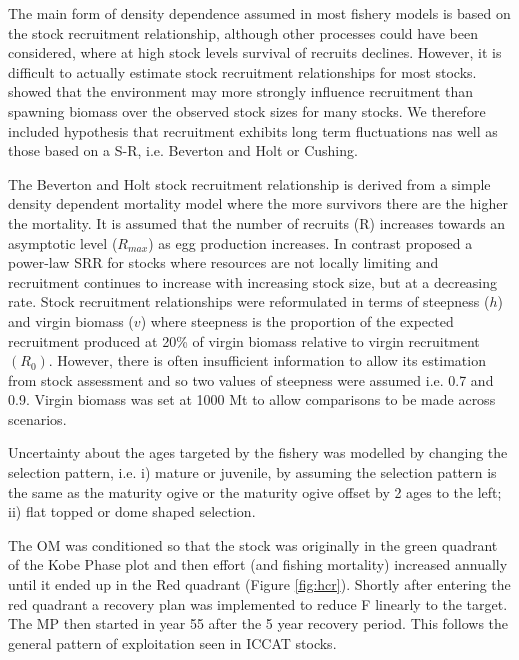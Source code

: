 \documentclass[%
nonumbib,      %
%
]{nrc1}                          %
\begin{document}
The main form of density dependence assumed in most fishery models is based on the stock recruitment relationship, although other processes \cite[e.g. M,][]{powers2014age} could have been considered, where at high stock levels survival of recruits declines. However, it is difficult to actually estimate stock recruitment relationships for most stocks. \cite{szuwalski2014examining} showed that the environment may more strongly influence recruitment than spawning biomass over the observed stock sizes for many stocks. We therefore included hypothesis that recruitment exhibits long term fluctuations \citep[i.e. red noise][]{ravier2001longterm} nas well as those based on a S-R, i.e. Beverton and Holt or Cushing. 

The Beverton and Holt stock recruitment relationship \citep{beverton1993dynamics} is derived from a simple density dependent mortality model where the more survivors there are the higher the mortality. It is assumed that the number of recruits (R) increases towards an asymptotic level ($R_{max}$) as egg production increases. In contrast \citep{cushing1973dependence} proposed a power-law SRR for stocks where resources are not locally limiting and recruitment continues to increase with increasing stock size, but at a decreasing rate. Stock recruitment relationships were reformulated in terms of steepness ($h$) and virgin biomass ($v$)  where steepness is the proportion of the expected recruitment produced at 20\% of virgin biomass relative to virgin recruitment  $(R_0)$. However, there is often insufficient information to allow its estimation from stock assessment\citep{issf2011steep} and so two values of steepness were assumed i.e. 0.7 and 0.9. Virgin biomass was set at 1000 Mt to allow comparisons to be made across scenarios.
 
Uncertainty about the ages targeted by the fishery was modelled by changing the selection pattern, i.e. i) mature or juvenile, by  assuming the selection pattern is the same as the maturity ogive or the maturity ogive offset by 2 ages to the left; ii) flat topped or dome shaped selection. 


The OM was conditioned so that the stock was originally in the green quadrant of the Kobe Phase plot and then effort (and fishing mortality) increased annually until it ended up in the Red quadrant (Figure \ref{fig:hcr}). Shortly after entering the red quadrant a recovery plan was implemented to reduce F linearly to the target. The MP then started in year 55 after the 5 year recovery period. This follows the general pattern of exploitation seen in ICCAT stocks.
\end{document}

